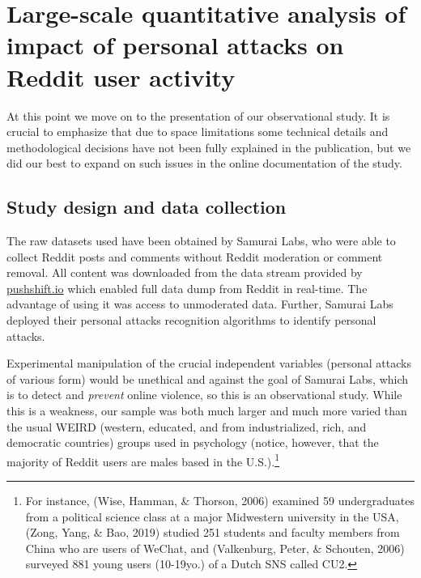 \documentclass[
  10pt,
  dvipsnames]{scrartcl}
\begin{document}
\section{Large-scale quantitative analysis of impact of personal attacks on
Reddit user activity}
\label{quantanalysis}

At this point we move on to the presentation of our observational study.
It is crucial to emphasize that due to space limitations some technical
details and methodological decisions have not been fully explained in
the publication, but we did our best to expand on such issues in the
online documentation of the study.

\subsection{Study design and data collection}

The raw datasets used have been obtained by \textsf{Samurai Labs}, who
were able to collect \textsf{Reddit} posts and comments without
\textsf{Reddit} moderation or comment removal. All content was
downloaded from the data stream provided by \url{pushshift.io} which
enabled full data dump from Reddit in real-time. The advantage of using
it was access to unmoderated data. Further, \textsf{Samurai Labs}
deployed their personal attacks recognition algorithms to identify
personal attacks.

Experimental manipulation of the crucial independent variables (personal
attacks of various form) would be unethical and against the goal of
\textsf{Samurai Labs}, which is to detect and \emph{prevent} online
violence, so this is an observational study. While this is a weakness,
our sample was both much larger and much more varied than the usual
WEIRD (western, educated, and from industrialized, rich, and democratic
countries) groups used in psychology (notice, however, that the majority
of Reddit users are males based in the U.S.).\footnote{For instance,
  (Wise, Hamman, \& Thorson, 2006) examined 59 undergraduates from a
  political science class at a major Midwestern university in the USA,
  (Zong, Yang, \& Bao, 2019) studied 251 students and faculty members
  from China who are users of WeChat, and (Valkenburg, Peter, \&
  Schouten, 2006) surveyed 881 young users (10-19yo.) of a Dutch SNS
  called CU2.}
\end{document}
